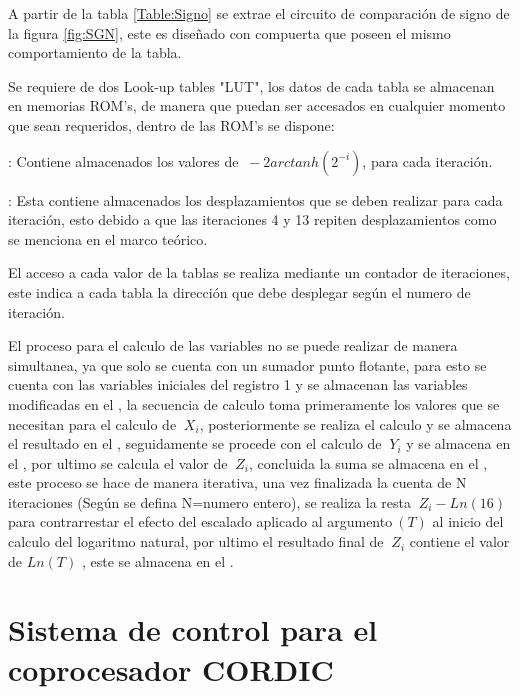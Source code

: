A partir de la tabla \ref{Table:Signo} se extrae el circuito de comparación de signo de la figura \ref{fig:SGN}, este es diseñado con compuerta  que poseen el mismo comportamiento de la tabla. 


Se requiere de dos Look-up tables "LUT", los datos de cada tabla se almacenan en memorias ROM's, de manera que puedan ser accesados en cualquier momento que sean requeridos, dentro de las ROM's se dispone:   

\begin{compactitem}

\item {}: Contiene almacenados los valores de $\ -2arctanh \left( 2^{-i} \right) $, para cada iteración.  
\item {}: Esta contiene almacenados los desplazamientos que se deben realizar para cada iteración, esto debido a que las iteraciones 4 y 13 repiten desplazamientos como se menciona en el marco teórico. 

\end{compactitem}

El acceso a cada valor de la tablas se realiza mediante un contador de iteraciones, este indica a cada tabla la dirección que debe desplegar según el numero de iteración.  

El proceso para el calculo de las variables no se puede realizar de manera simultanea, ya que solo se cuenta con un sumador punto flotante, para esto se cuenta con las variables iniciales del registro 1 y se almacenan las variables modificadas en el , la secuencia de calculo toma primeramente los valores que se necesitan para el calculo de  $\ X_i $, posteriormente se realiza el calculo y se almacena el resultado en el , seguidamente se procede con el calculo de $\ Y_i $ y se almacena en el , por ultimo se calcula el valor de $\ Z_i $, concluida la suma se almacena en el , este proceso se hace de manera iterativa, una vez finalizada la cuenta de N iteraciones (Según se defina N=numero entero), se realiza la resta $\ Z_i - Ln\left(16\right) $ para contrarrestar el efecto del escalado aplicado al argumento$\ \left(T\right) $ al inicio del calculo del logaritmo natural, por ultimo el resultado final de $\ Z_i $ contiene el valor de $Ln \left(T \right)$ , este se almacena en el .

\section{Sistema de control para el coprocesador CORDIC}

